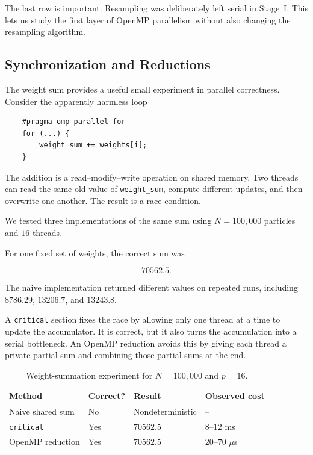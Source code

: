 The last row is important. Resampling was deliberately left serial in
Stage~I. This lets us study the first layer of OpenMP parallelism without
also changing the resampling algorithm.


\subsection{Synchronization and Reductions}
\label{subsec:stage1-synchronization}

The weight sum provides a useful small experiment in parallel
correctness. Consider the apparently harmless loop

\begin{verbatim}
	#pragma omp parallel for
	for (...) {
		weight_sum += weights[i];
	}
\end{verbatim}

The addition is a read--modify--write operation on shared memory. Two
threads can read the same old value of \texttt{weight\_sum}, compute
different updates, and then overwrite one another. The result is a race
condition.

We tested three implementations of the same sum using
\(N=100{,}000\) particles and \(16\) threads.

For one fixed set of weights, the correct sum was

\begin{equation}
	70562.5.
\end{equation}

The naive implementation returned different values on repeated runs,
including \(8786.29\), \(13206.7\), and \(13243.8\).

A \texttt{critical} section fixes the race by allowing only one thread
at a time to update the accumulator. It is correct, but it also turns
the accumulation into a serial bottleneck. An OpenMP reduction avoids
this by giving each thread a private partial sum and combining those
partial sums at the end.

\begin{table}[H]
	\centering
	\caption{
		Weight-summation experiment for \(N=100{,}000\) and
		\(p=16\).
	}
	\label{tab:stage1-synchronization}
	\begin{tabular}{llll}
		\toprule
		Method & Correct? & Result & Observed cost \\
		\midrule
		Naive shared sum & No & Nondeterministic & -- \\
		\texttt{critical} & Yes & \(70562.5\) & \(8\)--\(12\) ms \\
		OpenMP reduction & Yes & \(70562.5\) & \(20\)--\(70\) \(\mu\)s \\
		\bottomrule
	\end{tabular}
\end{table}

